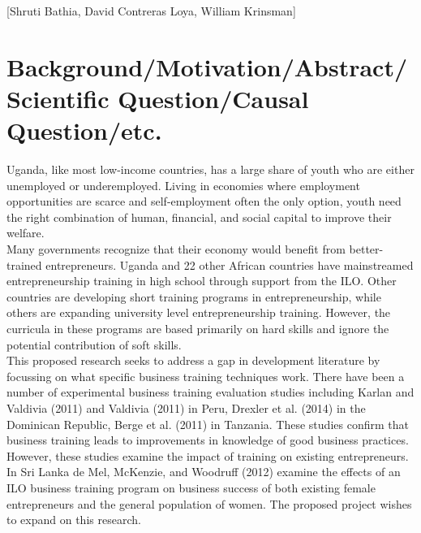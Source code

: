 \documentclass[oneside, notitlepage]{book}
\begin{document}
[Shruti Bathia, David Contreras Loya, William Krinsman]


\section{Background/Motivation/Abstract/Scientific Question/Causal Question/etc.}
\label{cha:backgr-quest-quest}

Uganda, like most low-income countries, has a large share of youth who are either unemployed or underemployed. Living in economies where employment opportunities are scarce and self-employment often the only option, youth need the right combination of human, financial, and social capital to improve their welfare.\\

Many governments recognize that their economy would benefit from better-trained entrepreneurs. Uganda and 22 other African countries have mainstreamed entrepreneurship training in high school through support from the ILO. Other countries are developing short training programs in entrepreneurship, while others are expanding university level entrepreneurship training. However, the curricula in these programs are based primarily on hard skills and ignore the potential contribution of soft skills.\\

This proposed research seeks to address a gap in development literature by focussing on what specific business training techniques work. There have been a number of experimental business training evaluation studies including Karlan and Valdivia (2011)\cite{karlanAndValdivia2011} and Valdivia (2011)\cite{valdivia2011} in Peru, Drexler et al. (2014)\cite{drexler2014} in the Dominican Republic, Berge et al. (2011)\cite{berge2011} in Tanzania. These studies confirm that business training leads to improvements in knowledge of good business practices. However, these studies examine the impact of training on existing entrepreneurs. In Sri Lanka de Mel, McKenzie, and Woodruff (2012)\cite{deMelEtAl2012} examine the effects of an ILO business training program on business success of both existing female entrepreneurs and the general population of women. The proposed project wishes to expand on this research. \\
\end{document}
